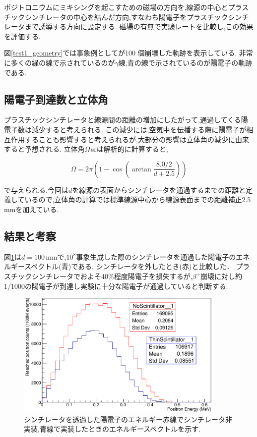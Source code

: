 ポジトロニウムにミキシングを起こすための磁場の方向を,線源の中心とプラスチックシンチレータの中心を結んだ方向,すなわち陽電子をプラスチックシンチレータまで誘導する方向に設定する.
磁場の有無で実験レートを比較し,この効果を評価する.

図\ref{test1_geometry}では事象例としてが100 個崩壊した軌跡を表示している.
非常に多くの緑の線で示されているのが$\gamma$線,青の線で示されているのが陽電子の軌跡である.

\subsection{陽電子到達数と立体角}

プラスチックシンチレータと線源間の距離の増加にしたがって,通過してくる陽電子数は減少すると考えられる.
この減少には,空気中を伝播する際に陽電子が相互作用することも影響すると考えられるが,大部分の影響は立体角の減少に由来すると予想される.
立体角$\Omega$\,srは解析的に計算すると,

\begin{equation}
	\nonumber
	\Omega = 2\pi \left( 1-\cos\left(\arctan\frac{8.0/2}{d+2.5}\right)\right)
\end{equation}

で与えられる.今回は$d$を線源の表面からシンチレータを通過するまでの距離と定義しているので,立体角の計算では標準線源中心から線源表面までの距離補正2.5 mmを加えている.

\subsection{結果と考察}

図\ref{test1}は$d=100$\,mmで,$10^8$事象生成した際のシンチレータを通過した陽電子のエネルギースペクトル(青)である. シンチレータを外したとき(赤)と比較した．
プラスチックシンチレータでおよそ40\%程度陽電子を損失するが,$\beta^+$崩壊に対し約1/1000の陽電子が到達し実験に十分な陽電子が通過していると判断する.

\begin{figure}[!tbp]
	\centering
		\includegraphics[width=10cm]{fig/test1.pdf}
	\caption[シンチレータを透過した陽電子のエネルギー]{シンチレータを透過した陽電子のエネルギー\newline 赤線でシンチレータ非実装,青線で実装したときのエネルギースペクトルを示す.}
	\label{test1}
\end{figure}

